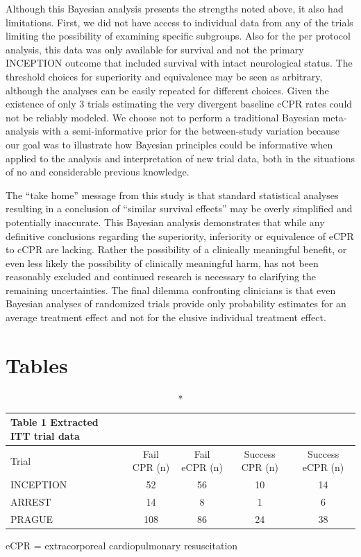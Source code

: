 \documentclass[
  super,
  preprint,
  3p]{elsarticle}
\begin{document}
Although this Bayesian analysis presents the strengths noted above, it
also had limitations. First, we did not have access to individual data
from any of the trials limiting the possibility of examining specific
subgroups. Also for the per protocol analysis, this data was only
available for survival and not the primary INCEPTION outcome that
included survival with intact neurological status. The threshold choices
for superiority and equivalence may be seen as arbitrary, although the
analyses can be easily repeated for different choices. Given the
existence of only 3 trials estimating the very divergent baseline cCPR
rates could not be reliably modeled. We choose not to perform a
traditional Bayesian meta-analysis with a semi-informative prior for the
between-study variation because our goal was to illustrate how Bayesian
principles could be informative when applied to the analysis and
interpretation of new trial data, both in the situations of no and
considerable previous knowledge.

The ``take home'' message from this study is that standard statistical
analyses resulting in a conclusion of ``similar survival effects'' may
be overly simplified and potentially inaccurate. This Bayesian analysis
demonstrates that while any definitive conclusions regarding the
superiority, inferiority or equivalence of eCPR to cCPR are lacking.
Rather the possibility of a clinically meaningful benefit, or even less
likely the possibility of clinically meaningful harm, has not been
reasonably excluded and continued research is necessary to clarifying
the remaining uncertainties. The final dilemma confronting clinicians is
that even Bayesian analyses of randomized trials provide only
probability estimates for an average treatment effect and not for the
elusive individual treatment effect.

\newpage

\hypertarget{tables}{%
\section{Tables}\label{tables}}

\setlength{\LTpost}{0mm}
\begin{longtable}{lcccc}
\caption*{
{\large Table 1 Extracted ITT trial data}
} \\ 
\toprule
Trial & Fail CPR (n) & Fail eCPR (n) & Success CPR (n) & Success eCPR (n) \\ 
\midrule
INCEPTION & 52 & 56 & 10 & 14 \\ 
ARREST & 14 & 8 & 1 & 6 \\ 
PRAGUE & 108 & 86 & 24 & 38 \\ 
\bottomrule
\end{longtable}
\begin{minipage}{\linewidth}
eCPR = extracorporeal cardiopulmonary resuscitation\\
\end{minipage}
\end{document}
